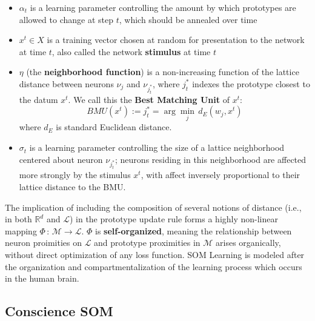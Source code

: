 \documentclass[]{article}
\providecommand{\tightlist}{%
  \setlength{\itemsep}{0pt}\setlength{\parskip}{0pt}}
\begin{document}
\begin{itemize}
\tightlist
\item
  \(\alpha_t\) is a learning parameter controlling the amount by which prototypes are allowed to change at step \(t\), which should be annealed over time
\item
  \(x^t \in X\) is a training vector chosen at random for presentation to the network at time \(t\), also called the network \textbf{stimulus} at time \(t\)
\item
  \(\eta\) (the \textbf{neighborhood function}) is a non-increasing function of the lattice distance between neurons \(\nu_j\) and \(\nu_{j^*_t}\), where \(j^*_t\) indexes the prototype closest to the datum \(x^t\). We call this the \textbf{Best Matching Unit} of \(x^t\):
  \[ BMU(x^t) := j^*_t = \arg\min_j \, d_E(w_j, x^t) \]
  where \(d_E\) is standard Euclidean distance.\\
\item
  \(\sigma_t\) is a learning parameter controlling the size of a lattice neighborhood centered about neuron \(\nu_{j^*_t}\); neurons residing in this neighborhood are affected more strongly by the stimulus \(x^t\), with affect inversely proportional to their lattice distance to the BMU.
\end{itemize}

The implication of including the composition of several notions of distance (i.e., in both \(\mathbb{R}^d\) and \(\mathcal{L}\)) in the prototype update rule forms a highly non-linear mapping \(\Phi \, : \, \mathcal{M} \to \mathcal{L}\). \(\Phi\) is \textbf{self-organized}, meaning the relationship between neuron proimities on \(\mathcal{L}\) and prototype proximities in \(\mathcal{M}\) arises organically, without direct optimization of any loss function. SOM Learning is modeled after the organization and compartmentalization of the learning process which occurs in the human brain.

\hypertarget{conscience-som}{%
\subsection{Conscience SOM}\label{conscience-som}}
\end{document}
